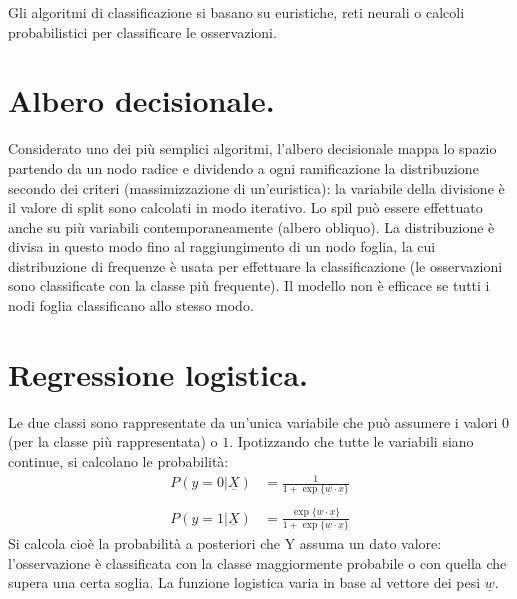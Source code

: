 \documentclass[11pt, a4page, twocolumn]{article}
\begin{document}
Gli algoritmi di classificazione si basano su euristiche, reti neurali o calcoli probabilistici per classificare le osservazioni.


\section{Albero decisionale.}
Considerato uno dei più semplici algoritmi, l'albero decisionale mappa lo spazio partendo da un nodo radice e dividendo a ogni ramificazione la distribuzione secondo dei criteri (massimizzazione di un'euristica): la variabile della divisione è il valore di split sono calcolati in modo iterativo.
Lo spil può essere effettuato anche su più variabili contemporaneamente (albero obliquo).
La distribuzione è divisa in questo modo fino al raggiungimento di un nodo foglia, la cui distribuzione di frequenze è usata per effettuare la classificazione (le osservazioni sono classificate con la classe più frequente).
Il modello non è efficace se tutti i nodi foglia classificano allo stesso modo.


\section{Regressione logistica.}
Le due classi sono rappresentate da un'unica variabile che può assumere i valori $0$ (per la classe più rappresentata) o $1$.
Ipotizzando che tutte le variabili siano continue, si calcolano le probabilità:
\begin{align*}
P(y=0 | \underline{X}) &= \frac{1}{1 + \exp{\{\underline{w} \cdot \underline{x}\}}} \\ \\
P(y=1 | \underline{X}) &= \frac{\exp{\{\underline{w} \cdot \underline{x}\}}}{1 + \exp{\{\underline{w} \cdot \underline{x}\}}}
\end{align*}
Si calcola cioè la probabilità a posteriori che Y assuma un dato valore: l'osservazione è classificata con la classe maggiormente probabile o con quella che supera una certa soglia.
La funzione logistica varia in base al vettore dei pesi $\underline{w}$.
\end{document}
